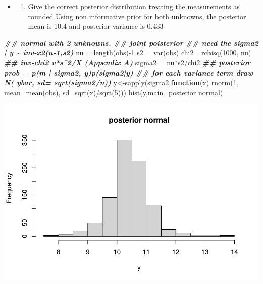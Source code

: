 \documentclass[
]{book}
\newenvironment{Shaded}{\begin{snugshade}}{\end{snugshade}}
\newcommand{\AttributeTok}[1]{\textcolor[rgb]{0.77,0.63,0.00}{#1}}
\newcommand{\ControlFlowTok}[1]{\textcolor[rgb]{0.13,0.29,0.53}{\textbf{#1}}}
\newcommand{\DecValTok}[1]{\textcolor[rgb]{0.00,0.00,0.81}{#1}}
\newcommand{\DocumentationTok}[1]{\textcolor[rgb]{0.56,0.35,0.01}{\textbf{\textit{#1}}}}
\newcommand{\FunctionTok}[1]{\textcolor[rgb]{0.00,0.00,0.00}{#1}}
\newcommand{\NormalTok}[1]{#1}
\newcommand{\OtherTok}[1]{\textcolor[rgb]{0.56,0.35,0.01}{#1}}
\newcommand{\SpecialCharTok}[1]{\textcolor[rgb]{0.00,0.00,0.00}{#1}}
\newcommand{\StringTok}[1]{\textcolor[rgb]{0.31,0.60,0.02}{#1}}
\providecommand{\tightlist}{%
  \setlength{\itemsep}{0pt}\setlength{\parskip}{0pt}}
\theoremstyle{definition}
\theoremstyle{definition}
\theoremstyle{definition}
\theoremstyle{definition}
\theoremstyle{remark}
\begin{document}
\begin{itemize}
\item
  \begin{enumerate}
  \def\labelenumi{(\alph{enumi})}
  \setcounter{enumi}{1}
  \tightlist
  \item
    Give the correct posterior distribution treating the measurements as rounded
    Using non informative prior for both unknowns, the posterior mean is 10.4 and posterior variance is 0.433
  \end{enumerate}
\end{itemize}

\begin{Shaded}
\begin{Highlighting}[]
 \DocumentationTok{\#\# normal with 2 unknowns.}
 \DocumentationTok{\#\# joint poisterior}
 \DocumentationTok{\#\# need the  sigma2 | y \textasciitilde{} inv{-}x2(n{-}1,s2)}
\NormalTok{  nu }\OtherTok{=} \FunctionTok{length}\NormalTok{(obs)}\SpecialCharTok{{-}}\DecValTok{1}
\NormalTok{  s2 }\OtherTok{=} \FunctionTok{var}\NormalTok{(obs)}
\NormalTok{  chi2}\OtherTok{=} \FunctionTok{rchisq}\NormalTok{(}\DecValTok{1000}\NormalTok{, nu)}
   \DocumentationTok{\#\# inv{-}chi2  v*s\^{}2/X  (Appendix A)}
\NormalTok{  sigma2 }\OtherTok{=}\NormalTok{ nu}\SpecialCharTok{*}\NormalTok{s2}\SpecialCharTok{/}\NormalTok{chi2}
  \DocumentationTok{\#\# posterior prob   =  p(m | sigma2, y)p(sigma2|y)}
   \DocumentationTok{\#\# for each variance term  draw   N( ybar,  sd= sqrt(sigma2/n))}
\NormalTok{  y}\OtherTok{\textless{}{-}}\FunctionTok{sapply}\NormalTok{(sigma2,}\ControlFlowTok{function}\NormalTok{(x) }\FunctionTok{rnorm}\NormalTok{(}\DecValTok{1}\NormalTok{, }\AttributeTok{mean=}\FunctionTok{mean}\NormalTok{(obs), }\AttributeTok{sd=}\FunctionTok{sqrt}\NormalTok{(x)}\SpecialCharTok{/}\FunctionTok{sqrt}\NormalTok{(}\DecValTok{5}\NormalTok{)))}
  \FunctionTok{hist}\NormalTok{(y,}\AttributeTok{main=}\StringTok{\textquotesingle{}posterior normal\textquotesingle{}}\NormalTok{)}
\end{Highlighting}
\end{Shaded}

\includegraphics{_main_files/figure-latex/unnamed-chunk-40-1.pdf}
\end{document}
